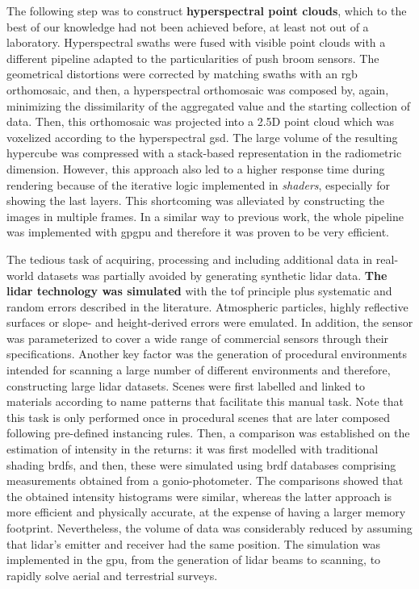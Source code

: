 The following step was to construct \textbf{hyperspectral point clouds}, which to the best of our knowledge had not been achieved before, at least not out of a laboratory. Hyperspectral swaths were fused with visible point clouds with a different pipeline adapted to the particularities of push broom sensors. The geometrical distortions were corrected by matching swaths with an \acrshort{rgb} orthomosaic, and then, a hyperspectral orthomosaic was composed by, again, minimizing the dissimilarity of the aggregated value and the starting collection of data. Then, this orthomosaic was projected into a 2.5D point cloud which was voxelized according to the hyperspectral \acrshort{gsd}. The large volume of the resulting hypercube was compressed with a stack-based representation in the radiometric dimension. However, this approach also led to a higher response time during rendering because of the iterative logic implemented in \textit{shaders}, especially for showing the last layers. This shortcoming was alleviated by constructing the images in multiple frames. In a similar way to previous work, the whole pipeline was implemented with \acrshort{gpgpu} and therefore it was proven to be very efficient.

The tedious task of acquiring, processing and including additional data in real-world datasets was partially avoided by generating synthetic \acrshort{lidar} data. \textbf{The \acrshort{lidar} technology was simulated} with the \acrshort{tof} principle plus systematic and random errors described in the literature. Atmospheric particles, highly reflective surfaces or slope- and height-derived errors were emulated. In addition, the sensor was parameterized to cover a wide range of commercial sensors through their specifications. Another key factor was the generation of procedural environments intended for scanning a large number of different environments and therefore, constructing large \acrshort{lidar} datasets. Scenes were first labelled and linked to materials according to name patterns that facilitate this manual task. Note that this task is only performed once in procedural scenes that are later composed following pre-defined instancing rules. Then, a comparison was established on the estimation of intensity in the returns: it was first modelled with traditional shading \acrshort{brdf}s, and then, these were simulated using \acrshort{brdf} databases comprising measurements obtained from a gonio-photometer. The comparisons showed that the obtained intensity histograms were similar, whereas the latter approach is more efficient and physically accurate, at the expense of having a larger memory footprint. Nevertheless, the volume of data was considerably reduced by assuming that \acrshort{lidar}'s emitter and receiver had the same position. The simulation was implemented in the \acrshort{gpu}, from the generation of \acrshort{lidar} beams to scanning, to rapidly solve aerial and terrestrial surveys. 

